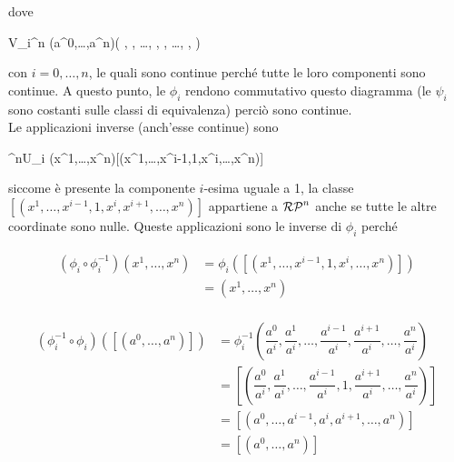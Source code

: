 
dove

	{V_{i}}{\R^{n}}
	{(a^{0},\dots,a^{n})}{\left( , , \dots, , , \dots, , \right)}

con $ i=0,\dots,n $, le quali sono continue perché tutte le loro componenti sono continue. A questo punto, le $ \phi_{i} $ rendono commutativo questo diagramma (le $ \psi_{i} $ sono costanti sulle classi di equivalenza) perciò sono continue.\\
Le applicazioni inverse (anch'esse continue) sono

	{\R^{n}}{U_{i}}
	{(x^{1},\dots,x^{n})}{[(x^{1},\dots,x^{i-1},1,x^{i},\dots,x^{n})]}

siccome è presente la componente $ i $-esima uguale a 1, la classe $ [(x^{1},\dots,x^{i-1},1,x^{i},x^{i+1},\dots,x^{n})] $ appartiene a $ \mathcal{RP}^{n} $ anche se tutte le altre coordinate sono nulle. Queste applicazioni sono le inverse di $ \phi_{i} $ perché

\begin{align}
	\begin{split}
		(\phi_{i} \circ \phi_{i}^{-1})(x^{1},\dots,x^{n}) &= \phi_{i}([(x^{1},\dots,x^{i-1},1,x^{i},\dots,x^{n})])\\
		&= (x^{1},\dots,x^{n})
	\end{split}	
\end{align}

\begin{align}
	\begin{split}
		(\phi^{-1}_{i} \circ \phi_{i})([(a^{0},\dots,a^{n})]) &= \phi_{i}^{-1} \left( \dfrac{a^{0}}{a^{i}}, \dfrac{a^{1}}{a^{i}}, \dots, \dfrac{a^{i-1}}{a^{i}}, \dfrac{a^{i+1}}{a^{i}}, \dots, \dfrac{a^{n}}{a^{i}} \right)\\
		&= \left[ \left( \dfrac{a^{0}}{a^{i}}, \dfrac{a^{1}}{a^{i}}, \dots, \dfrac{a^{i-1}}{a^{i}}, 1, \dfrac{a^{i+1}}{a^{i}}, \dots, \dfrac{a^{n}}{a^{i}} \right) \right]\\
		&= [(a^{0},\dots,a^{i-1},a^{i},a^{i+1},\dots,a^{n})]\\
		&= [(a^{0},\dots,a^{n})]
	\end{split}
\end{align}

